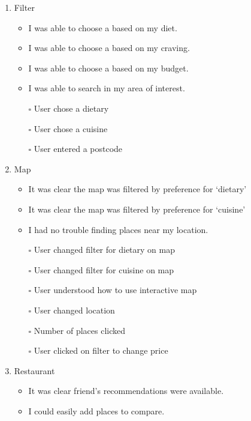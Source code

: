 \documentclass[a4 paper, 10pt]{article}
\begin{document}
    \begin{multicols}{2}
        \renewcommand{\labelitemi}{$\blacksquare$}
        \begin{enumerate}
            \item Filter
                \begin{itemize}
                    \item I was able to choose a based on my diet.
                    \item I was able to choose a based on my craving.
                    \item I was able to choose a based on my budget.
                    \item I was able to search in my area of interest.
                    \item[$\square$] User chose a dietary
                    \item[$\square$] User chose a cuisine
                    \item[$\square$] User entered a postcode 
                \end{itemize}
            \item Map
                \begin{itemize}
                    \item It was clear the map was filtered by preference for ‘dietary’
                    \item It was clear the map was filtered by preference for ‘cuisine’
                    \item I had no trouble finding places near my location.     
                    \item[$\square$] User changed filter for dietary on map
                    \item[$\square$] User changed filter for cuisine on map
                    \item[$\square$] User understood how to use interactive map
                    \item[$\square$] User changed location
                    \item[$\square$] Number of places clicked
                    \item[$\square$] User clicked on filter to change price
                \end{itemize}
            \item Restaurant
                \begin{itemize}
                    \item It was clear friend’s recommendations were available.
                    \item I could easily add places to compare.
                    

\end{itemize}
\end{enumerate}
\end{multicols}
\end{document}
